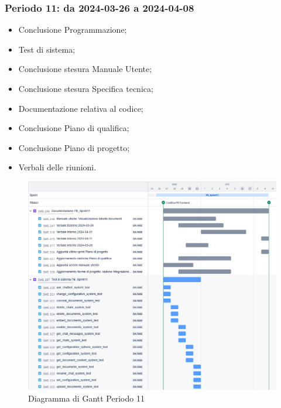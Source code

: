 \documentclass[10pt, a4paper]{article}
\begin{document}
\subsubsection{Periodo 11: da 2024-03-26 a 2024-04-08}
%
\begin{itemize}
    \item Conclusione Programmazione;
    \item Test di sistema;
    \item Conclusione stesura Manuale Utente;
    \item Conclusione stesura Specifica tecnica;
    \item Documentazione relativa al codice;
    \item Conclusione Piano di qualifica;
    \item Conclusione Piano di progetto;
    \item Verbali delle riunioni.
\end{itemize}
\begin{figure}[H]
    \centering        
    \includegraphics[width=15.5cm]{gantt/ganttPeriodo11.jpeg}
    \caption{Diagramma di Gantt Periodo 11}
\end{figure}

\newpage
\end{document}
